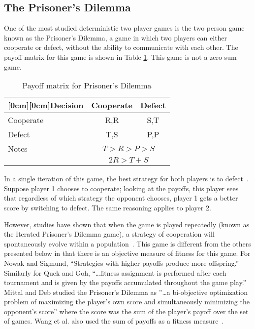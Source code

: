 \subsection{The Prisoner's Dilemma}

One of the most studied deterministic two player games is the two person game
known as the Prisoner's Dilemma, a game in which two players can either
cooperate or defect, without the ability to communicate with each other. The
payoff matrix for this game is shown in Table \ref{table-pdpayoff}. This game is
not a zero sum game. 

\begin{table}[h]
\caption{Payoff matrix for Prisoner's Dilemma}
\begin{center}
\begin{tabular}{|l|c|c|}
\hline
\multicolumn{1}{|l|}{\raisebox{-1.50ex}[0cm][0cm]{Decision\!}}
& \multicolumn{1}{|c|}{Cooperate}
& \multicolumn{1}{|c|}{Defect} \\ \hline
Cooperate &  R,R & S,T \\ \hline 
Defect    &  T,S & P,P  \\ \hline \hline
Notes & \multicolumn{2}{|c|}{\(T > R > P > S\)} \\ 
      & \multicolumn{2}{|c|}{\(2R > T + S\)} \\ \hline
\end{tabular}
\label{table-pdpayoff}
\end{center}
\end{table}

In a single iteration of this game, the best strategy for both players is to
defect~\cite{nash50,Nash1951}. Suppose player 1 chooses to cooperate;
looking at the payoffs, this player sees that regardless of which strategy the
opponent chooses, player 1 gets a better score by switching to defect. The same
reasoning applies to player 2.

However, studies have shown that when the game is played repeatedly (known as
the Iterated Prisoner's Dilemma game), a strategy of cooperation will
spontaneously evolve within a
population~\cite{Axelrod1984,Nowak1993,DBLP:conf/cig/QuekG07,Mittal2009,WangTao2010}.
This game is different from the others presented below in that there is an
objective measure of fitness for this game. For Nowak and Sigmund, ``Strategies
with higher payoffs produce more offspring.''~\cite{Nowak1993} Similarly for
Quek and Goh, ``\ldots fitness assignment is performed after each tournament and
is given by the payoffs accumulated throughout the game
play.''~\cite{DBLP:conf/cig/QuekG07} Mittal and Deb studied the Prisoner's
Dilemma as ''\ldots a bi-objective optimization problem of maximizing the
player's own score and simultaneously minimizing the opponent's score'' where
the score was the sum of the player's payoff over the set of games. Wang et al.
also used the sum of payoffs as a fitness measure~\cite{WangTao2010}.

